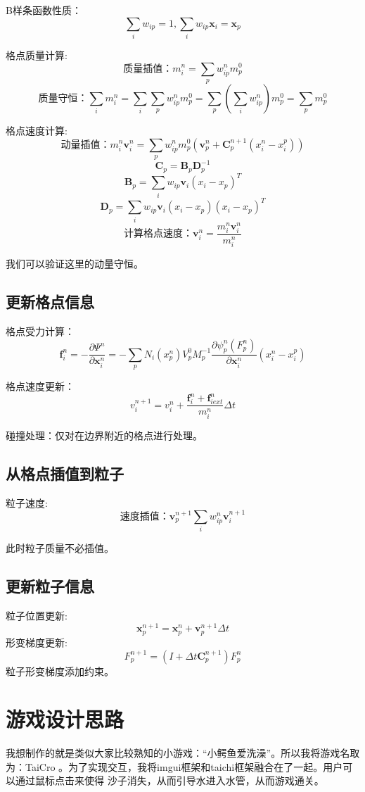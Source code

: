 \documentclass{article}
\begin{document}
	B样条函数性质：
	$$\sum_i w_{ip}=1,\sum_i w_{ip}\boldsymbol{x}_i=\boldsymbol{x}_p$$
	
	格点质量计算:
	$$\mbox{质量插值：}m_i^n=\sum_pw_{ip}^nm_p^0$$
	$$\mbox{质量守恒：}\sum_im_i^n=\sum_i\sum_pw_{ip}^nm_p^0=\sum_p
	\left(\sum_iw_{ip}^n\right)m_p^0=\sum_pm_p^0$$
	
	格点速度计算:
	$$\mbox{动量插值：}
	m_i^n\boldsymbol{v}_i^n=
	\sum_pw_{ip}^nm_p^0(\boldsymbol{v}_p^n+\boldsymbol{C}_p^{n+1}(x_i^n-x_i^p))$$
	$$\boldsymbol{C}_p=\boldsymbol{B}_p\boldsymbol{D}_p^{-1}$$
	$$\boldsymbol{B}_p=\sum_iw_{ip}\boldsymbol{v}_i(x_i-x_p)^T$$
	$$\boldsymbol{D}_p=\sum_iw_{ip}\boldsymbol{v}_i(x_i-x_p)(x_i-x_p)^T$$
	$$\mbox{计算格点速度：}\boldsymbol{v}_i^n=\frac{m_i^n\boldsymbol{v}_i^n}{m_i^n}$$
	
	我们可以验证这里的动量守恒。
	\subsection{更新格点信息}
	格点受力计算：
	$$\boldsymbol{f}_i^n=-\frac{\partial \Psi^n}{\partial \boldsymbol{x}_i^n}
	=-\sum_pN_i(x_p^n)V_p^0M_p^{-1}
	\frac{\partial\psi_p^n(F_p^n)}{\partial\boldsymbol{x}_i^n}(x_i^n-x_i^p)$$
	
	格点速度更新：
	$$v_i^{n+1}=v_i^n+
	\frac{\boldsymbol{f}_i^n+\boldsymbol{f}_{iext}^n}{m_i^n}\Delta t$$
	 
	碰撞处理：仅对在边界附近的格点进行处理。
	\subsection{从格点插值到粒子}
	粒子速度:
	$$\mbox{速度插值：}\boldsymbol{v}_p^{n+1}\sum_iw_{ip}^n\boldsymbol{v}_i^{n+1}$$
	
	此时粒子质量不必插值。
	\subsection{更新粒子信息}
	粒子位置更新:
	$$\boldsymbol{x}_p^{n+1}=\boldsymbol{x}_p^n+\boldsymbol{v}_p^{n+1}\Delta t$$
	形变梯度更新:
	$$F_p^{n+1}=(I+\Delta t\boldsymbol{C}_p^{n+1})F_p^n$$
	粒子形变梯度添加约束。
	
	\section{游戏设计思路}
	我想制作的就是类似大家比较熟知的小游戏：“小鳄鱼爱洗澡”。所以我将游戏名取为：TaiCro
	。为了实现交互，我将imgui框架和taichi框架融合在了一起。用户可以通过鼠标点击来使得
	沙子消失，从而引导水进入水管，从而游戏通关。
\end{document}
